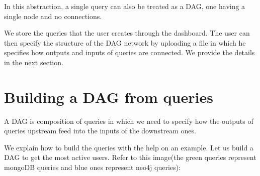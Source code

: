 \documentclass[letterpaper,10pt,english]{sphinxmanual}
\begin{document}
In this abstraction, a single query can also be treated as a DAG, one having a single node and no connections.

We store the queries that the user creates through the dashboard. The user can then specify the structure of the DAG network by uploading a file in which he specifies how outputs and inputs of queries are connected. We provide the details in the next section.


\section{Building a DAG from queries}
\label{\detokenize{dag:building-a-dag-from-queries}}
A DAG is composition of queries in which we need to specify how the outputs of queries upstream feed into the inputs of the downstream ones.

We explain how to build the queries with the help on an example. Let us build a DAG to get the most active users. Refer to this image(the green queries represent mongoDB queries and blue ones represent neo4j queries):

\noindent{}
\end{document}
